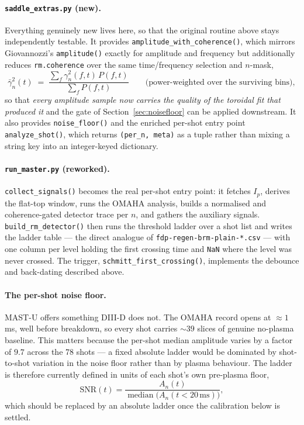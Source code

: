 \documentclass[11pt,a4paper]{article}
\newcommand{\code}[1]{\texttt{\small #1}}
\newcommand{\bk}{\discretionary{}{}{}}   %
\begin{document}
\paragraph{\code{saddle\_extras.py} (new).} Everything genuinely new lives here, so that the
original routine above stays independently testable. It provides
\code{amplitude\_with\_coherence()}, which mirrors Giovannozzi's \code{amplitude()} exactly
for amplitude and frequency but additionally reduces \code{rm.coherence} over the same
time/frequency selection and $n$-mask,
\begin{equation}
\bar\gamma_n^2(t) \;=\; \frac{\sum_f \gamma_n^2(f,t)\,P(f,t)}{\sum_f P(f,t)}
\qquad \text{(power-weighted over the surviving bins)},
\end{equation}
so that \emph{every amplitude sample now carries the quality of the toroidal fit that
produced it} and the gate of Section~\ref{sec:noisefloor} can be applied downstream. It also
provides \code{noise\_floor()} and the enriched per-shot entry point \code{analyze\_shot()},
which returns \code{(per\_n, meta)} as a tuple rather than mixing a string key into an
integer-keyed dictionary.

\paragraph{\code{run\_master.py} (reworked).} \code{collect\_signals()} becomes the real
per-shot entry point: it fetches $I_p$, derives the flat-top window, runs the OMAHA
analysis, builds a normalised and coherence-gated detector trace per $n$, and gathers the
auxiliary signals. \code{build\_rm\_detector()} then runs the threshold ladder over a shot
list and writes the ladder table --- the direct analogue of
\code{fdp-\bk regen-\bk brm-\bk plain-\bk *.csv} --- with one column per level holding the
first crossing time and \code{NaN} where the level was never crossed. The trigger,
\code{schmitt\_first\_crossing()}, implements the debounce and back-dating described above.

\paragraph{The per-shot noise floor.} MAST-U offers something DIII-D does not. The OMAHA
record opens at $\approx 1$\,ms, well before breakdown, so every shot carries $\sim 39$
slices of genuine no-plasma baseline. This matters because the per-shot median amplitude
varies by a factor of $9.7$ across the 78 shots --- a fixed absolute ladder would be
dominated by shot-to-shot variation in the noise floor rather than by plasma behaviour.
The ladder is therefore currently defined in units of each shot's own pre-plasma floor,
\begin{equation}
\text{SNR}(t) = \frac{A_{n}(t)}{\operatorname{median}\big(A_n(t < 20\,\mathrm{ms})\big)},
\end{equation}
which should be replaced by an absolute ladder once the calibration below is settled.
\end{document}
